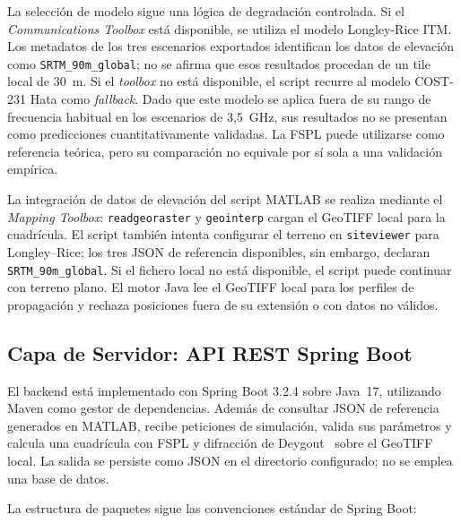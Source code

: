La selección de modelo sigue una lógica de degradación controlada. Si el
\textit{Communications Toolbox} está disponible, se utiliza el modelo Longley-Rice ITM.
Los metadatos de los tres escenarios exportados identifican los datos de elevación como
\texttt{SRTM\_90m\_global}; no se afirma que esos resultados procedan de un tile local de
30~m. Si el \textit{toolbox} no está disponible, el script recurre al modelo COST-231 Hata
como \textit{fallback}. Dado que este modelo se aplica fuera de su rango de frecuencia
habitual en los escenarios de 3,5~GHz, sus resultados no se presentan como predicciones
cuantitativamente validadas. La FSPL puede utilizarse como referencia teórica, pero su
comparación no equivale por sí sola a una validación empírica.

La integración de datos de elevación del script MATLAB se realiza mediante el
\textit{Mapping Toolbox}: \lstinline{readgeoraster} y \lstinline{geointerp} cargan el
GeoTIFF local para la cuadrícula. El script también intenta configurar el terreno en
\texttt{siteviewer} para Longley--Rice; los tres JSON de referencia disponibles, sin
embargo, declaran \texttt{SRTM\_90m\_global}. Si el fichero local no está disponible, el
script puede continuar con terreno plano. El motor Java lee el GeoTIFF local para los
perfiles de propagación y rechaza posiciones fuera de su extensión o con datos no válidos.

\subsection{Capa de Servidor: API REST Spring Boot}
\label{subsec:arq_backend}

El backend está implementado con Spring Boot 3.2.4 sobre Java~17, utilizando Maven como
gestor de dependencias. Además de consultar JSON de referencia generados en MATLAB, recibe
peticiones de simulación, valida sus parámetros y calcula una cuadrícula con FSPL y
difracción de Deygout~\cite{deygout1966multiple} sobre el GeoTIFF local. La salida se
persiste como JSON en el directorio configurado; no se emplea una base de datos.

La estructura de paquetes sigue las convenciones estándar de Spring Boot:

